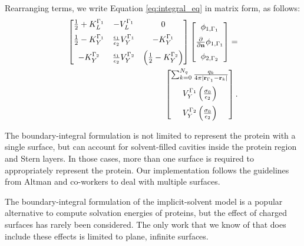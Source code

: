 Rearranging terms, we write Equation \eqref{eq:integral_eq} in matrix form, as follows:
%
 \begin{align} \label{eq:matrix_dphi}
 \left[
    \begin{matrix} %
       \frac{1}{2} + K_{L}^{\Gamma_1} & -V_{L}^{\Gamma_1} & 0 \vspace{0.2cm}\\
       \frac{1}{2} - K_{Y}^{\Gamma_1} &  \frac{\epsilon_1}{\epsilon_2} V_{Y}^{\Gamma_1} & -K_{Y}^{\Gamma_1} \vspace{0.2cm} \\
       - K_{Y}^{\Gamma_2} & \frac{\epsilon_1}{\epsilon_2} V_{Y}^{\Gamma_2} & \left(\frac{1}{2} - K_{Y}^{\Gamma_2}\right) \\
    \end{matrix}
    \right] \left[ 
    \begin{matrix} %
       \phi_{1,\Gamma_1} \vspace{0.2cm} \\
       \frac{\partial}{\partial \mathbf{n}} \phi_{1,\Gamma_1} \vspace{0.2cm}\\
       \phi_{2,\Gamma_2}\\
    \end{matrix} 
     \right] =   \nonumber \\
    \left[
    \begin{matrix} %
       \sum_{k=0}^{N_q} \frac{q_k}{4\pi|\mathbf{r}_{\Gamma_1} - \mathbf{r}_k|} \vspace{0.2cm} \\
        V_{Y}^{\Gamma_1} \left( \frac{\sigma_0}{\epsilon_2} \right) \vspace{0.2cm} \\
        V_{Y}^{\Gamma_2} \left( \frac{\sigma_0}{\epsilon_2} \right)
    \end{matrix}
    \right].
 \end{align}

The boundary-integral formulation is not limited to represent the protein with a single surface, but can account for solvent-filled cavities inside the protein region and Stern layers.\cite{CooperBardhanBarba2013} In those cases, more than one surface is required to appropriately represent the protein. 
Our implementation follows the guidelines from Altman and co-workers\cite{AltmanBardhanWhiteTidor09} to deal with multiple surfaces.

The boundary-integral formulation of the implicit-solvent model is a popular alternative to compute solvation energies of proteins,\cite{YoonLenhoff1990, Juffer1991a, LuETal2006, BajajETal2011, AltmanBardhanWhiteTidor09, GengKrasny2013, CooperBardhanBarba2013} but the effect of charged surfaces has rarely been considered. The only work that we know of that does include these effects is limited to plane, infinite surfaces.\cite{YoonLenhoff1992} 
